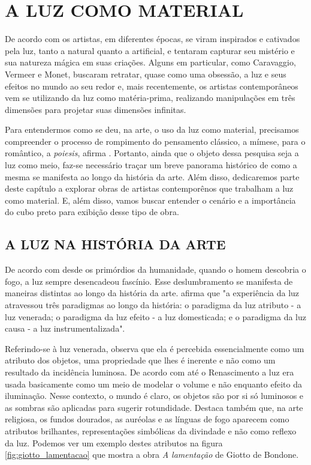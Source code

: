 \chapter{A LUZ COMO MATERIAL}

De acordo com  os artistas, em diferentes épocas, se viram inspirados e cativados pela luz, tanto a natural quanto a artificial, e tentaram capturar seu mistério e sua natureza mágica em suas criações. Alguns em particular, como Caravaggio, Vermeer e Monet, buscaram retratar, quase como uma obsessão, a luz e seus efeitos no mundo ao seu redor e, mais recentemente, os artistas contemporâneos vem se utilizando da luz como matéria-prima, realizando manipulações em três dimensões para projetar suas dimensões infinitas. 

Para entendermos como se deu, na arte, o uso da luz como material, precisamos compreender o processo de rompimento do pensamento clássico, a mímese, para o romântico, a \textit{poiesis}, afirma . Portanto, ainda que o objeto dessa pesquisa seja a luz como meio, faz-se necessário traçar um breve panorama histórico de como a mesma se manifesta ao longo da história da arte. Além disso, dedicaremos parte deste capítulo a explorar obras de artistas contemporênos que trabalham a luz como material. E, além disso, vamos buscar entender o cenário e a importância do cubo preto para exibição desse tipo de obra.


\section{A LUZ NA HISTÓRIA DA ARTE}

De acordo com   desde os primórdios da humanidade, quando o homem descobria o fogo, a luz sempre desencadeou fascínio. Esse deslumbramento se manifesta de maneiras distintas ao longo da história da arte.  afirma que "a experiência da luz atravessou três paradigmas ao longo da história: o paradigma da luz atributo - a luz venerada; o paradigma da luz efeito - a luz domesticada; e o paradigma da luz causa - a luz instrumentalizada".

Referindo-se à luz venerada,  observa que ela é percebida essencialmente como um atributo dos objetos, uma propriedade que lhes é inerente e não como um resultado da incidência luminosa. De acordo com  até o Renascimento a luz era usada basicamente como um meio de modelar o volume e não enquanto efeito da iluminação. Nesse contexto, o mundo é claro, os objetos são por si só luminosos e as sombras são aplicadas para sugerir rotundidade. Destaca também que, na arte religiosa, os fundos dourados, as auréolas e as línguas de fogo aparecem como atributos brilhantes, representações simbólicas da divindade e não como reflexo da luz. Podemos ver um exemplo destes atributos na figura \ref{fig:giotto_lamentacao} que mostra a obra \textit{A lamentação} de Giotto de Bondone.

